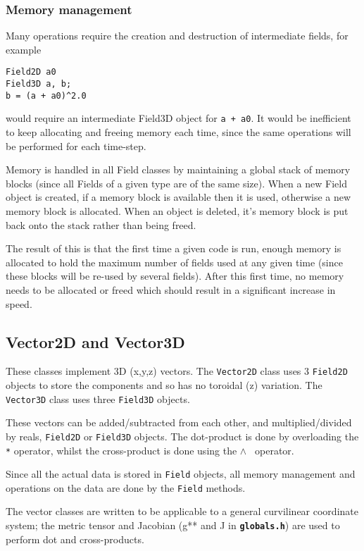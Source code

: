 \documentclass[12pt, a4paper]{article}
\newcommand{\code}[1]{\texttt{#1}}
\newcommand{\file}[1]{\texttt{\bf #1}}
\newcommand{\pow}{\ensuremath{\wedge} }
\begin{document}
\subsubsection{Memory management}

Many operations require the creation and destruction of intermediate
fields, for example
\begin{verbatim}
Field2D a0
Field3D a, b;
b = (a + a0)^2.0
\end{verbatim}
would require an intermediate Field3D object for \code{a + a0}. It would
be inefficient to keep allocating and freeing memory each time, since
the same operations will be performed for each time-step.

Memory is handled in all Field classes by maintaining a global stack
of memory blocks (since all Fields of a given type are of the same size).
When a new Field object is created, if a memory block is available then it is used,
otherwise a new memory block is allocated. When an object is deleted, it's memory block
is put back onto the stack rather than being freed.

The result of this is that the first time a given code is run, enough memory
is allocated to hold the maximum number of fields used at any given time (since these blocks
will be re-used by several fields). After this first time, no memory needs to be
allocated or freed which should result in a significant increase in speed.

\subsection{Vector2D and Vector3D}

These classes implement 3D (x,y,z) vectors. The \code{Vector2D} class
uses 3 \code{Field2D} objects to store the components and so has no toroidal
(z) variation. The \code{Vector3D} class uses three \code{Field3D} objects.

These vectors can be added/subtracted from each other, and multiplied/divided 
by reals, \code{Field2D} or \code{Field3D} objects. The dot-product is
done by overloading the \code{*} operator, whilst the cross-product is
done using the \code{\pow} operator.

Since all the actual data is stored in \code{Field} objects, all memory management
and operations on the data are done by the \code{Field} methods.

The vector classes are written to be applicable to a general curvilinear coordinate
system; the metric tensor and Jacobian (g** and J in \file{globals.h}) are used
to perform dot and cross-products.
\end{document}
